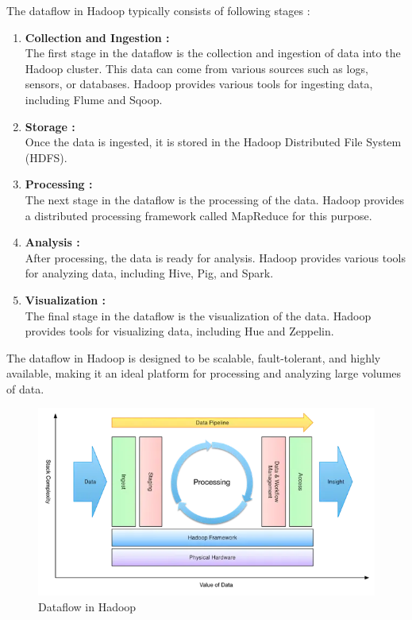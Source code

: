 \documentclass[12pt]{article}
\begin{document}
The dataflow in Hadoop typically consists of following stages :
\begin{enumerate}
    \item {\bfseries Collection and Ingestion : \\}
    The first stage in the dataflow is the collection and ingestion of data into the Hadoop cluster. This data can come from various sources such as logs, sensors, or databases. Hadoop provides various tools for ingesting data, including Flume and Sqoop.
    \item {\bfseries Storage : \\}
    Once the data is ingested, it is stored in the Hadoop Distributed File System (HDFS). 
    \item {\bfseries Processing : \\}
    The next stage in the dataflow is the processing of the data. Hadoop provides a distributed processing framework called MapReduce for this purpose.
    \item {\bfseries Analysis : \\}
    After processing, the data is ready for analysis. Hadoop provides various tools for analyzing data, including Hive, Pig, and Spark.
    \item {\bfseries Visualization : \\}
    The final stage in the dataflow is the visualization of the data. Hadoop provides tools for visualizing data, including Hue and Zeppelin.
\end{enumerate}
The dataflow in Hadoop is designed to be scalable, fault-tolerant, and highly available, making it an ideal platform for processing and analyzing large volumes of data.
\begin{figure}[h!]
    \centering
    \includegraphics[scale = 0.7]{images/Dataflow.png}
    \caption{Dataflow in Hadoop}
\end{figure}
\end{document}
